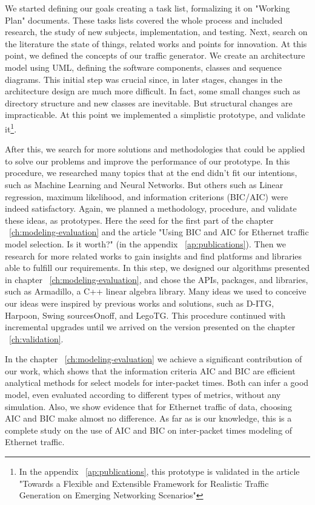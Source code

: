 We started defining our goals creating a task list, formalizing it on "Working Plan" documents. These tasks lists covered the whole process and included research, the study of new subjects, implementation, and testing. Next, search on the literature the state of things, related works and points for innovation. At this point, we defined the concepts of our traffic generator. We create an architecture model using UML, defining the software components, classes and sequence diagrams. This initial step was crucial since, in later stages, changes in the architecture design are much more difficult. In fact, some small changes such as directory structure and new classes are inevitable. But structural changes are impracticable. At this point we implemented a simplistic prototype, and validate it\footnote{In the appendix ~\ref{ap:publications}, this prototype is validated in the article "Towards a Flexible and Extensible Framework for Realistic Traffic Generation on Emerging Networking Scenarios"}. 


After this, we search for more solutions and methodologies that could be applied to solve our problems and improve the performance of our prototype. In this procedure, we researched many topics that at the end didn't fit our intentions, such as Machine Learning and Neural Networks. But others such as Linear regression, maximum likelihood, and information criterions (BIC/AIC) were indeed satisfactory. Again, we planned a methodology, procedure, and validate these ideas, as prototypes. Here the seed for the first part of the chapter ~\ref{ch:modeling-evaluation} and the article "Using BIC and AIC for Ethernet traffic model selection. Is it worth?" (in the appendix ~\ref{ap:publications}). Then we research for more related works to gain insights and find platforms and libraries able to fulfill our requirements. In this step, we designed our algorithms presented in chapter ~\ref{ch:modeling-evaluation}, and chose the APIs, packages, and libraries, such as Armadillo\cite{armadillo}, a C++ linear algebra library. Many ideas we used to conceive our ideas were inspired by previous works and solutions, such as D-ITG\cite{ditg-paper}, Harpoon\cite{harpoon-validation}, Swing\cite{swing-paper} sourcesOnoff\cite{sourcesonoff-paper}, and LegoTG\cite{legotg-paper}. This procedure continued with incremental upgrades until we arrived on the version presented on the chapter ~\ref{ch:validation}. 


In the chapter ~\ref{ch:modeling-evaluation} we achieve a significant contribution of our work, which shows that the information criteria AIC and BIC are efficient analytical methods for select models for inter-packet times. Both can infer a good model, even evaluated according to different types of metrics, without any simulation. Also, we show evidence that for Ethernet traffic of data, choosing AIC and BIC make almost no difference. As far as is our knowledge, this is a complete study on the use of AIC and BIC on inter-packet times modeling of Ethernet traffic.


